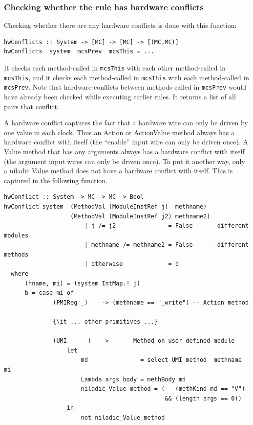\documentclass[11pt]{article}
\newcommand{\term}[1]{\texttt{#1}}
\begin{document}

\subsubsection{Checking whether the rule has hardware conflicts}

Checking whether there are any hardware conflicts is done with this function:

\begin{Verbatim}[frame=single, commandchars=\\\{\}]
hwConflicts :: System -> [MC] -> [MC] -> [(MC,MC)]
hwConflicts  system  mcsPrev  mcsThis = ...
\end{Verbatim}

It checks each method-called in \term{mcsThis} with each other
method-called in \term{mcsThis}, and it checks each method-called in
\term{mcsThis} with each method-called in \term{mcsPrev}.  Note that
hardware-conflicts between methods-called in \term{mcsPrev} would have
already been checked while executing earlier rules.  It returns a list
of all pairs that conflict.

A hardware conflict captures the fact that a hardware wire can only be
driven by one value in each clock.  Thus an Action or ActionValue
method always has a hardware conflict with itself (the ``enable''
input wire can only be driven once).  A Value method that has any
arguments always has a hardware conflict with itself (the argument
input wires can only be driven once).  To put it another way, only a
niladic Value method does not have a hardware conflict with itself.
This is captured in the following function.

\begin{Verbatim}[frame=single, commandchars=\\\{\}]
hwConflict :: System -> MC -> MC -> Bool
hwConflict system  (MethodVal (ModuleInstRef j)  methname)
                   (MethodVal (ModuleInstRef j2) methname2)
                       | j /= j2               = False    -- different modules
                       | methname /= methname2 = False    -- different methods
                       | otherwise             = b
  where
      (hname, mi) = (system IntMap.! j)
      b = case mi of
              (PMIReg _)    -> (methname == "_write") -- Action method

              {\it ... other primitives ...}

              (UMI _ _ _)   ->    -- Method on user-defined module
                  let
                      md               = select_UMI_method  methname  mi
                      Lambda args body = methBody md
                      niladic_Value_method = (   (methKind md == "V")
                                              && (length args == 0))
                  in
                      not niladic_Value_method
\end{Verbatim}
\end{document}
